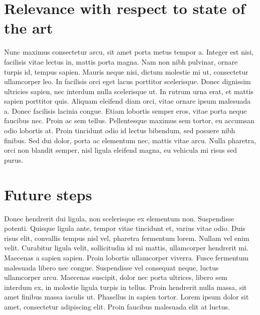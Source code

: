 \documentclass[12pt, a4paper,twoside]{tesi_upf}
\begin{document}
\section{Relevance with respect to state of the art}

Nunc maximus consectetur arcu, sit amet porta metus tempor a. Integer est nisi, facilisis vitae lectus in, mattis porta magna. Nam non nibh pulvinar, ornare turpis id, tempus sapien. Mauris neque nisi, dictum molestie mi ut, consectetur ullamcorper leo. In facilisis orci eget lacus porttitor scelerisque. Donec dignissim ultricies sapien, nec interdum nulla scelerisque ut. In rutrum urna erat, et mattis sapien porttitor quis. Aliquam eleifend diam orci, vitae ornare ipsum malesuada a. Donec facilisis lacinia congue. Etiam lobortis semper eros, vitae porta neque faucibus nec. Proin ac sem tellus. Pellentesque maximus sem tortor, eu accumsan odio lobortis at. Proin tincidunt odio id lectus bibendum, sed posuere nibh finibus. Sed dui dolor, porta ac elementum nec, mattis vitae arcu. Nulla pharetra, orci non blandit semper, nisl ligula eleifend magna, eu vehicula mi risus sed purus.

\section{Future steps}

Donec hendrerit dui ligula, non scelerisque ex elementum non. Suspendisse potenti. Quisque ligula ante, tempor vitae tincidunt et, varius vitae odio. Duis risus elit, convallis tempus nisl vel, pharetra fermentum lorem. Nullam vel enim velit. Curabitur ligula velit, sollicitudin id mi mattis, ullamcorper hendrerit mi. Maecenas a sapien sapien. Proin lobortis ullamcorper viverra. Fusce fermentum malesuada libero nec congue. Suspendisse vel consequat neque, luctus ullamcorper arcu. Maecenas suscipit, dolor nec porta ultrices, libero sem interdum ex, in molestie ligula turpis in tellus. Proin hendrerit nulla massa, sit amet finibus massa iaculis ut. Phasellus in sapien tortor. Lorem ipsum dolor sit amet, consectetur adipiscing elit. Proin faucibus malesuada elit at luctus.
\end{document}

